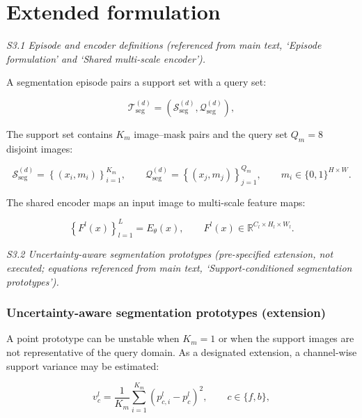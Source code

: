 \documentclass[11pt]{article}
\begin{document}
\section{Extended formulation}\label{sm:formulation}

\noindent\emph{S3.1 Episode and encoder definitions (referenced from main text, `Episode formulation' and `Shared multi-scale encoder').}

A segmentation episode pairs a support set with a query set:

\begin{equation}
  \mathcal{T}_{\mathrm{seg}}^{(d)}
  = \left(\mathcal{S}_{\mathrm{seg}}^{(d)},
  \mathcal{Q}_{\mathrm{seg}}^{(d)}\right),
  \label{eq:seg_task}
\end{equation}

The support set contains $K_m$ image--mask pairs and the query set $Q_m=8$ disjoint images:

\begin{equation}
  \mathcal{S}_{\mathrm{seg}}^{(d)}
  = \left\{(x_i,m_i)\right\}_{i=1}^{K_m},
  \qquad
  \mathcal{Q}_{\mathrm{seg}}^{(d)}
  = \left\{(x_j,m_j)\right\}_{j=1}^{Q_m},
  \qquad m_i\in\{0,1\}^{H\times W}.
  \label{eq:seg_support_query}
\end{equation}

The shared encoder maps an input image to multi-scale feature maps:

\begin{equation}
  \left\{F^l(x)\right\}_{l=1}^{L}=E_\theta(x),
  \qquad F^l(x)\in\mathbb{R}^{C_l\times H_l\times W_l}.
  \label{eq:multiscale_encoder}
\end{equation}

\noindent\emph{S3.2 Uncertainty-aware segmentation prototypes (pre-specified extension, not executed; equations referenced from main text, `Support-conditioned segmentation prototypes').}

\subsubsection{Uncertainty-aware segmentation prototypes (extension)}

A point prototype can be unstable when $K_m=1$ or when the support images are
not representative of the query domain. As a designated extension, a
channel-wise support variance may be estimated:

\begin{equation}
  v_c^l
  = \frac{1}{K_m}\sum_{i=1}^{K_m}
    \left(p_{c,i}^{l}-p_c^l\right)^2,
  \qquad c\in\{f,b\},
  \label{eq:prototype_variance}
\end{equation}
\end{document}
